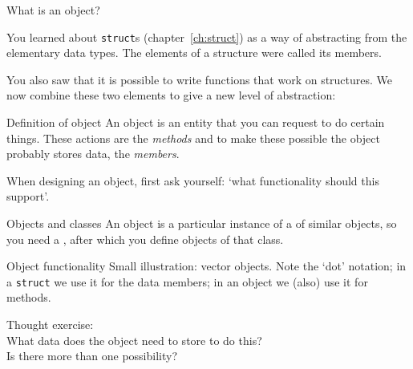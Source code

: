 
 {What is an object?}
\label{sec:object}

You learned about \lstinline{struct}s (chapter~\ref{ch:struct}) as a way of
abstracting from the elementary data types. The elements of a
structure were called its members.

You also saw that it is possible to write
functions that work on structures. We now combine these two elements
to give a new level of abstraction:

\begin{block}{Definition of object}
  \label{sl:object-def}
  An object is an entity that you can request to do certain
  things. These actions are the
  \emph{methods}
  and to make these possible the object probably stores
  data, the
  \emph{members}.

  When designing an object, first ask yourself: `what functionality
  should this support'.

\end{block}

\begin{block}{Objects and classes}
  \label{label:class-def}
  An object is a particular instance of a  of
  similar objects, so you need a ,
  after which you define objects of that class.
\end{block}

\begin{block}{Object functionality}
  \label{sl:object-functionality}
  Small illustration: vector objects.
  Note the `dot' notation; in a \lstinline{struct} we use it for the
  data members; in an object we (also) use it for methods.
\end{block}

\begin{exercise}
  \label{ex:pointdesign}
  Thought exercise:\\
  What data does the object need to store to do this?\\
  Is there more than one possibility?
\end{exercise}

